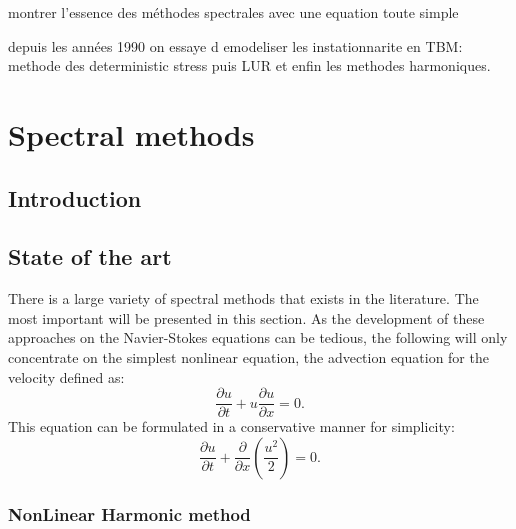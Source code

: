 
montrer l'essence des méthodes spectrales avec une equation toute simple

depuis les années 1990 on essaye d emodeliser les instationnarite en TBM:
methode des deterministic stress puis LUR et enfin les methodes harmoniques.

\chapter{Spectral methods} %
\label{cha:spectral_methods}

\section{Introduction} %
\label{sec:sm_introduction}

\section{State of the art} %
\label{sec:sm_state_of_the_art}

There is a large variety of spectral methods that exists in the
literature. The most important will be presented in this section.
As the development of these approaches on the Navier-Stokes equations
can be tedious, the following will only concentrate on the simplest
nonlinear equation, the advection equation for the velocity
defined as:
\begin{equation}
	\frac{\partial u}{\partial t} + 
	u \frac{\partial u}{\partial x} = 
	0.
	\label{eq:sm_nonlinear_convection}
\end{equation}
This equation can be formulated in a conservative manner for simplicity:
\begin{equation}
	\frac{\partial u}{\partial t} + 
	\frac{\partial}{\partial x} \left( \frac{u^2}{2} \right) = 
	0.
	\label{eq:sm_nonlinear_convection_conservative}
\end{equation}

\subsection{NonLinear Harmonic method} %
\label{sub:sm_nonlinear_harmonic_method}

